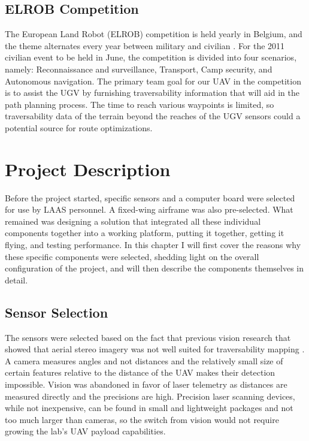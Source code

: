 \documentclass[a4paper,11pt]{report}
\begin{document}
\section{ELROB Competition}

The European Land Robot (ELROB) competition is held yearly in Belgium, and the theme alternates every year between military and civilian \cite{elrob}. For the 2011 civilian event to be held in June, the competition is divided into four scenarios, namely: Reconnaissance and surveillance, Transport, Camp security, and Autonomous navigation. The primary team goal for our UAV in the competition is to assist the UGV by furnishing traversability information that will aid in the path planning process. The time to reach various waypoints is limited, so traversability data of the terrain beyond the reaches of the UGV sensors could a potential source for route optimizations.

\chapter{Project Description}

Before the project started, specific sensors and a computer board were selected for use by LAAS personnel. A fixed-wing airframe was also pre-selected. What remained was designing a solution that integrated all these individual components together into a working platform, putting it together, getting it flying, and testing performance. In this chapter I will first cover the reasons why these specific components were selected, shedding light on the overall configuration of the project, and will then describe the components themselves in detail.

\section{Sensor Selection}

The sensors were selected based on the fact that previous vision research that showed that aerial stereo imagery was not well suited for traversability mapping \cite{norman_paper}. A camera measures angles and not distances and the relatively small size of certain features relative to the distance of the UAV makes their detection impossible. Vision was abandoned in favor of laser telemetry as distances are measured directly and the precisions are high. Precision laser scanning devices, while not inexpensive, can be found in small and lightweight packages and not too much larger than cameras, so the switch from vision would not require growing the lab's UAV payload capabilities.
\end{document}
